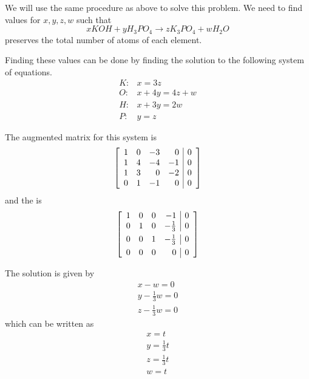 \begin{solution}
We will use the same procedure as above to solve this problem. We need to find values for 
$x,y,z,w$ such that  
\begin{equation*}
xKOH+yH_{3}PO_{4}\rightarrow zK_{3}PO_{4}+wH_{2}O
\end{equation*}
preserves the total number of atoms of each element. 

Finding these values can be done by finding the solution to the following system of equations.
\begin{equation*}
\begin{array}{cl}
K: & x=3z \\ 
O: & x+4y=4z+w \\ 
H: & x+3y=2w \\ 
P: & y=z
\end{array}
\end{equation*}

The augmented matrix for this system is 
\begin{equation*}
\left[ 
\begin{array}{rrrr|r}
1 & 0 & -3 & 0 & 0 \\ 
1 & 4 & -4 & -1 & 0 \\ 
1 & 3 & 0 & -2 & 0 \\ 
0 & 1 & -1 & 0 & 0
\end{array}
\right]
\end{equation*}
and the {\rref} is
\begin{equation*}
\leftB
\begin{array}{rrrr|r}
1 & 0 & 0 & -1 & 0 \\ 
0 & 1 & 0 & -\vspace{0.05in}\frac{1}{3} & 0 \\ 
0 & 0 & 1 & -\vspace{0.05in}\frac{1}{3} & 0 \\ 
0 & 0 & 0 & 0 & 0
\end{array}
\rightB
\end{equation*}

The solution is given by 
\begin{equation*}
\begin{array}{c}
x - w = 0 \\
y - \frac{1}{3}w = 0 \\
z - \frac{1}{3}w = 0
\end{array}
\end{equation*}
which can be written as
\begin{equation*}
\begin{array}{c}
x = t \\
y = \frac{1}{3}t \\
z = \frac{1}{3}t \\
w = t
\end{array}
\end{equation*}


\end{solution}
